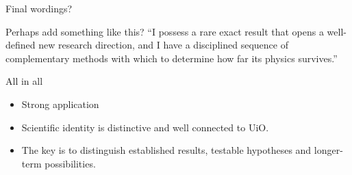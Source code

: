 \documentclass[aspectratio=169,11pt]{beamer}
\begin{document}
\begin{frame}{Final wordings?}
\begin{block}{Perhaps add something like this?}
``I possess a rare exact result that opens a well-defined new research direction, and I have a disciplined sequence of complementary methods with which to determine how far its physics survives.''
\end{block}
All in all
\begin{itemize}
  \item Strong application
  \item Scientific identity is distinctive and well connected to UiO.
  \item The key is to distinguish established results, testable hypotheses and longer-term possibilities.
\end{itemize}
\end{frame}
\end{document}
